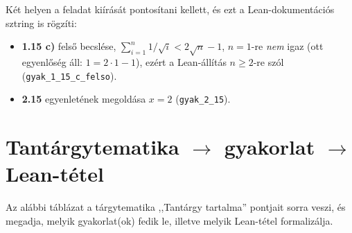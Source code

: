 \documentclass[11pt,a4paper]{article}
\newcommand{\lean}[1]{\texttt{\small #1}}
\theoremstyle{definition}
\begin{document}
\medskip
Két helyen a feladat kiírását pontosítani kellett, és ezt a Lean-dokumentációs
sztring is rögzíti:
\begin{itemize}[nosep]
  \item \textbf{1.15 c)} felső becslése, $\sum_{i=1}^{n} 1/\sqrt{i} < 2\sqrt n - 1$,
        $n=1$-re \emph{nem} igaz (ott egyenlőség áll: $1 = 2\cdot 1 - 1$), ezért a
        Lean-állítás $n \ge 2$-re szól (\lean{gyak\_1\_15\_c\_felso}).
  \item \textbf{2.15} egyenletének megoldása $x = 2$ (\lean{gyak\_2\_15}).
\end{itemize}

\section{Tantárgytematika $\to$ gyakorlat $\to$ Lean-tétel}

Az alábbi táblázat a tárgytematika ,,Tantárgy tartalma'' pontjait sorra veszi, és
megadja, melyik gyakorlat(ok) fedik le, illetve melyik Lean-tétel formalizálja.
\end{document}

